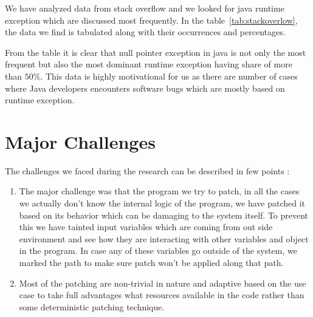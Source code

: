 We have analyzed data from stack overflow and we looked for java runtime
exception which are discussed most frequently. In the
table~\ref{tab:stackoverlow}, the data we find is tabulated along with their
occurrences and percentages.


From the table it is clear that null pointer exception in java is not only the
most frequent but also the most dominant runtime exception having share of more
than $50\%$. This data is highly motivational for us as there are number of
cases where Java developers encounters software bugs which are mostly based on
runtime exception.

\section{Major Challenges}
\label{section:challenges}

The challenges we faced during the research can be described in few points :

\begin{enumerate}
  \item The major challenge was that the program we try to patch, in all the
  cases we actually don't know the internal logic of the program, we have
  patched it based on its behavior which can be damaging to the system itself.
  To prevent this we have tainted input variables which are coming from out side
  environment and see how they are interacting with other variables and object
  in the program. In case any of these variables go outside of the system, we
  marked the path to make sure patch won't be applied along that path.
  
  \item Most of the patching are non-trivial in nature and adaptive based on the
  use case to take full advantages what resources available in the code rather
  than some deterministic patching technique.
\end{enumerate}


